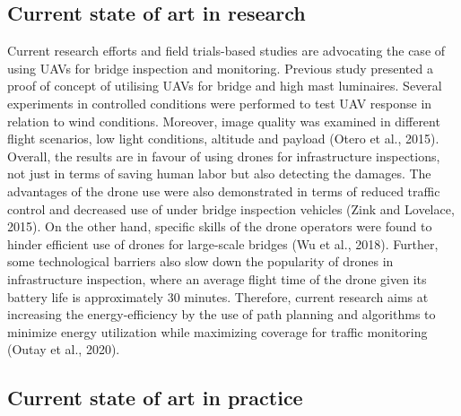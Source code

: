 \documentclass[
]{book}
\begin{document}
\hypertarget{current-state-of-art-in-research-2}{%
\subsection*{Current state of art in research}\label{current-state-of-art-in-research-2}}

Current research efforts and field trials-based studies are advocating the case of using UAVs for bridge inspection and monitoring. Previous study presented a proof of concept of utilising UAVs for bridge and high mast luminaires. Several experiments in controlled conditions were performed to test UAV response in relation to wind conditions. Moreover, image quality was examined in different flight scenarios, low light conditions, altitude and payload (Otero et al., 2015). Overall, the results are in favour of using drones for infrastructure inspections, not just in terms of saving human labor but also detecting the damages. The advantages of the drone use were also demonstrated in terms of reduced traffic control and decreased use of under bridge inspection vehicles (Zink and Lovelace, 2015). On the other hand, specific skills of the drone operators were found to hinder efficient use of drones for large-scale bridges (Wu et al., 2018). Further, some technological barriers also slow down the popularity of drones in infrastructure inspection, where an average flight time of the drone given its battery life is approximately 30 minutes. Therefore, current research aims at increasing the energy-efficiency by the use of path planning and algorithms to minimize energy utilization while maximizing coverage for traffic monitoring (Outay et al., 2020).

\hypertarget{current-state-of-art-in-practice-2}{%
\subsection*{Current state of art in practice}\label{current-state-of-art-in-practice-2}}
\end{document}
